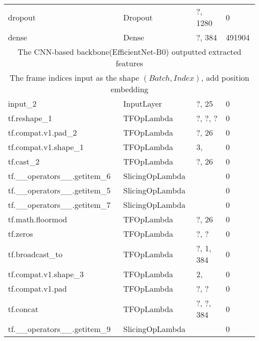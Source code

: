 \begin{longtable}{llll}
                    dropout &                Dropout &                           ?, 1280 &        0 \\
                      dense &                  Dense &                            ?, 384 &   491904 \\
\midrule
\multicolumn{4}{c}{The CNN-based backbone(EfficientNet-B0) outputted extracted features} \\
\multicolumn{4}{c}{The frame indices input as the shape $(Batch, Index)$, add position embedding} \\ \midrule
                    input\_2 &             InputLayer &                           ?, 25 &        0 \\
               tf.reshape\_1 &             TFOpLambda &                     ?, ?, ? &        0 \\
         tf.compat.v1.pad\_2 &             TFOpLambda &                             ?, 26 &        0 \\
       tf.compat.v1.shape\_1 &             TFOpLambda &                                   3, &        0 \\
                  tf.cast\_2 &             TFOpLambda &                             ?, 26 &        0 \\
 tf.\_\_operators\_\_.getitem\_6 &        SlicingOpLambda &                                      &        0 \\
 tf.\_\_operators\_\_.getitem\_5 &        SlicingOpLambda &                                      &        0 \\
 tf.\_\_operators\_\_.getitem\_7 &        SlicingOpLambda &                                      &        0 \\
           tf.math.floormod &             TFOpLambda &                             ?, 26 &        0 \\
                   tf.zeros &             TFOpLambda &                           ?, ? &        0 \\
            tf.broadcast\_to &             TFOpLambda &                         ?, 1, 384 &        0 \\
       tf.compat.v1.shape\_3 &             TFOpLambda &                                   2, &        0 \\
           tf.compat.v1.pad &             TFOpLambda &                           ?, ? &        0 \\
                  tf.concat &             TFOpLambda &                      ?, ?, 384 &        0 \\
 tf.\_\_operators\_\_.getitem\_9 &        SlicingOpLambda &                                      &        0 \\

\end{longtable}
